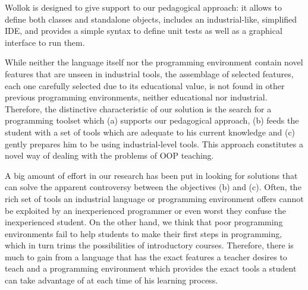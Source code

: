\medskip
Wollok is designed to give support to our pedagogical approach: 
it allows to define both classes and standalone objects, 
includes an industrial-like, simplified IDE, 
and 
provides a simple syntax to define unit tests as well as a graphical interface to run them.

While neither the language itself nor the programming environment contain novel features that are unseen in industrial tools,
the assemblage of selected features, each one carefully selected due to its educational value,
is not found in other previous programming environments, neither educational nor industrial.
Therefore, the distinctive characteristic of our solution is the search for a programming toolset which 
(a) supports our pedagogical approach,
(b) feeds the student with a set of tools which are adequate to his current knowledge
and (c) gently prepares him to be using industrial-level tools. This approach constitutes a novel way of dealing with the problems of OOP teaching.

A big amount of effort in our research has been put in looking for solutions that can solve the apparent controversy between the objectives (b) and (c).
Often, the rich set of tools an industrial language or programming environment offers cannot be exploited by an inexperienced programmer or even worst they confuse the inexperienced student.
On the other hand, we think that poor programming environments fail to help students to make their first steps in programming, which in turn trims the possibilities of introductory courses.
Therefore, there is much to gain from a language that has the exact features a teacher desires to teach
and a programming environment which provides the exact tools a student can take advantage of at each time of his learning process.

